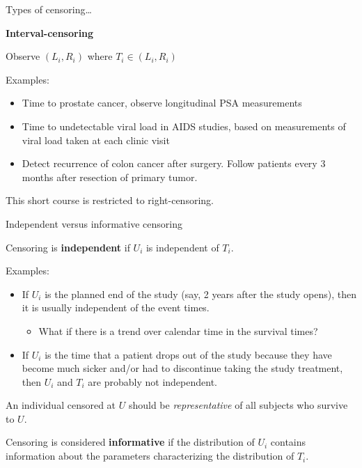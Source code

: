 \documentclass[ignorenonframetext,]{beamer}
\providecommand{\tightlist}{%
  \setlength{\itemsep}{0pt}\setlength{\parskip}{0pt}}
\begin{document}
\begin{frame}{%
\protect\hypertarget{types-of-censoring-2}{%
Types of censoring\ldots}}

\textbf{Interval-censoring}

Observe \((L_i,R_i)\) where \(T_i\in (L_i,R_i)\)

Examples:

\begin{itemize}
\item
  Time to prostate cancer, observe longitudinal PSA measurements
\item
  Time to undetectable viral load in AIDS studies, based on measurements
  of viral load taken at each clinic visit
\item
  Detect recurrence of colon cancer after surgery. Follow patients every
  3 months after resection of primary tumor.
\end{itemize}

This short course is restricted to right-censoring.

\end{frame}

\begin{frame}{%
\protect\hypertarget{independent-versus-informative-censoring}{%
Independent versus informative censoring}}

Censoring is \textbf{independent} if \(U_i\) is independent of \(T_i\).

Examples:

\begin{itemize}
\tightlist
\item
  If \(U_i\) is the planned end of the study (say, 2 years after the
  study opens), then it is usually independent of the event times.

  \begin{itemize}
  \tightlist
  \item
    What if there is a trend over calendar time in the survival times?
  \end{itemize}
\item
  If \(U_i\) is the time that a patient drops out of the study because
  they have become much sicker and/or had to discontinue taking the
  study treatment, then \(U_i\) and \(T_i\) are probably not
  independent.
\end{itemize}

An individual censored at \(U\) should be \emph{representative} of all
subjects who survive to \(U\).

Censoring is considered \textbf{informative} if the distribution of
\(U_i\) contains information about the parameters characterizing the
distribution of \(T_i\).

\end{frame}
\end{document}
